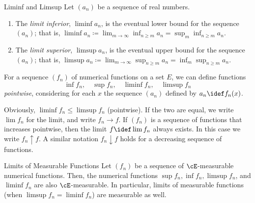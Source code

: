 \begin{defn}{Liminf and Limsup}{}
	Let $(a_n)$ be a sequence of real numbers.
	\begin{enumerate}
		\item The \textit{limit inferior}, $\liminf a_n$, is the eventual lower bound for the sequence $(a_n)$; that is, $\liminf a_n \coloneqq \lim_{m \to \infty} \inf_{n \ge m} a_n = \sup_m \inf_{n \ge m} a_n$.
		\item The \textit{limit superior}, $\limsup a_n$, is the eventual upper bound for the sequence $(a_n)$; that is, $\limsup a_n \coloneqq \lim_{m \to \infty} \sup_{n \ge m} a_n = \inf_m \sup_{n \ge m} a_n$.
	\end{enumerate}
\end{defn}

For a sequence $(f_n)$ of numerical functions on a set $E$, we can define functions
\begin{equation*}
	\inf f_n, \quad \sup f_n, \quad \liminf f_n, \quad \limsup f_n
\end{equation*}
\textit{pointwise}, considering for each $x$ the sequence $(a_n)$ defined by $a_n \idef f_n(x)$.

Obviously, $\liminf f_n \le \limsup f_n$ (pointwise). If the two are equal, we write $\lim f_n$ for the limit, and write $f_n \to f$. If $(f_n)$ is a sequence of functions that increases pointwise, then the limit $f \idef \lim f_n$ always exists. In this case we write $f_n \uparrow f$. A similar notation $f_n \downarrow f$ holds for a decreasing sequence of functions.

\begin{prop}{Limits of Measurable Functions}{}
	Let $(f_n)$ be a sequence of $\cE$-measurable numerical functions. Then, the numerical functions $\sup f_n, \inf f_n, \limsup f_n$, and $\liminf f_n$ are also $\cE$-measurable. In particular, limits of measurable functions (when $\limsup f_n = \liminf f_n$) are measurable as well.
\end{prop}

